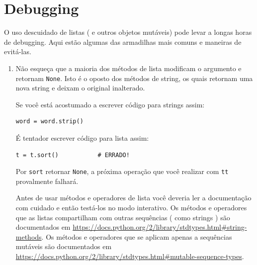 \section{Debugging}

O uso descuidado de listas ( e outros objetos mutáveis) 
pode levar a longas horas de debugging. Aqui estão algumas das
armadilhas mais comuns e maneiras de evitá-las.



\begin{enumerate}

\item Não esqueça que a maioria dos métodos de lista modificam o argumento
  e retornam {\tt None}. Isto é o oposto dos métodos de string, os quais retornam
  uma nova string e deixam o original inalterado.

Se você está acostumado a escrever código para strings assim:




\beforeverb
\begin{verbatim}
word = word.strip()
\end{verbatim}
\afterverb

É tentador escrever código para lista assim:

\beforeverb
\begin{verbatim}
t = t.sort()           # ERRADO!
\end{verbatim}
\afterverb


Por {\tt sort} retornar {\tt None}, a
próxima operação que você realizar com {\tt tt} provalmente falhará.

Antes de usar métodos e operadores de lista você deveria ler a documentação com
cuidado e então testá-los no modo interativo. Os métodos e operadores que as listas
compartilham com outras sequências ( como strings ) são documentados em
\url{https://docs.python.org/2/library/stdtypes.html#string-methods}.
Os métodos e operadores que se aplicam apenas a sequências mutáveis são documentados
em
\url{https://docs.python.org/2/library/stdtypes.html#mutable-sequence-types}.



\end{enumerate}
